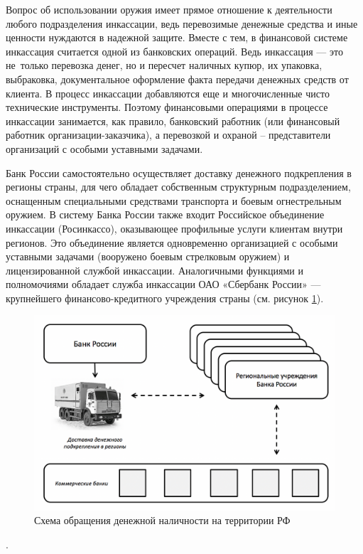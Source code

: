 \documentclass[a4paper,12pt,fleqn]{article} %
\begin{document}
Вопрос об использовании оружия имеет прямое отношение к деятельности любого подразделения инкассации, ведь перевозимые денежные средства и иные ценности нуждаются в надежной защите. Вместе с тем, в финансовой системе инкассация считается одной из банковских операций. Ведь инкассация --- это не~только перевозка денег, но и пересчет наличных купюр, их упаковка, выбраковка, документальное оформление факта передачи денежных средств от клиента. В процесс инкассации добавляются еще и многочисленные чисто технические инструменты. Поэтому финансовыми операциями в процессе инкассации занимается, как правило, банковский работник (или финансовый работник организации-заказчика), а перевозкой и охраной – представители организаций  с особыми уставными задачами.

Банк России самостоятельно осуществляет доставку денежного подкрепления в регионы страны, для чего обладает собственным структурным подразделением, оснащенным специальными средствами транспорта и боевым огнестрельным оружием. В систему Банка России также входит Российское объединение инкассации (Росинкассо), оказывающее профильные услуги клиентам внутри регионов. Это объединение является одновременно организацией с особыми уставными задачами (вооружено боевым стрелковым оружием) и лицензированной службой инкассации. Аналогичными функциями и полномочиями обладает служба инкассации ОАО «Сбербанк России» --- крупнейшего финансово-кредитного учреждения страны (см. рисунок \ref{image9}).

\begin{figure}[h]
	\centering
	\includegraphics[scale=0.7]{img9}
	\caption{Схема обращения денежной наличности на территории РФ}
	\label{image9}
\end{figure}.
\end{document}
